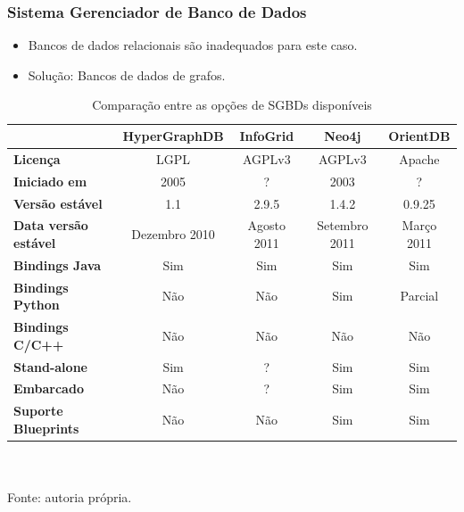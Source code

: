 \frame
{
\frametitle{Sistema Gerenciador de Banco de Dados}
\begin{itemize}
	\item Bancos de dados relacionais são inadequados para este caso.
	\item Solução: Bancos de dados de grafos.
\end{itemize}
\begin{table}[!htb]
	\centering
	\setlength{\tabcolsep}{2pt}
	\scriptsize
	\caption{Comparação entre as opções de SGBDs disponíveis}
	\newcolumntype{C}{c}
	\begin{tabular}{lccCc}
		\hline
		& \textbf{HyperGraphDB} & \textbf{InfoGrid} & \textbf{Neo4j} & \textbf{OrientDB} \\
		\hline
		\textbf{Licença} & LGPL & AGPLv3 & AGPLv3 & Apache \\
		\textbf{Iniciado em} & 2005 & ? & 2003 & ? \\
		\textbf{Versão estável} & 1.1 & 2.9.5 & 1.4.2 & 0.9.25 \\
		\textbf{Data versão estável} & Dezembro 2010 & Agosto 2011 & Setembro 2011 & Março 2011 \\
		\textbf{Bindings Java} & Sim & Sim & Sim & Sim \\
		\textbf{Bindings Python} & Não & Não & Sim & Parcial \\
		\textbf{Bindings C/C++} & Não & Não & Não & Não \\
		\textbf{Stand-alone} & Sim & ? & Sim & Sim \\
		\textbf{Embarcado} & Não & ? & Sim & Sim \\
		\textbf{Suporte Blueprints} & Não & Não & Sim & Sim \\
		\hline
	\end{tabular}
	\\ ~ \\
	\tiny
	Fonte: autoria própria.
\end{table}
}

